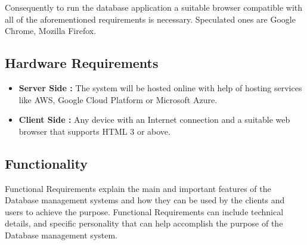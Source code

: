 \documentclass[12pt]{report}
\begin{document}
Consequently to run the database application a suitable browser compatible with all of the aforementioned requirements is necessary. Speculated ones are Google Chrome, Mozilla Firefox.




\subsection{Hardware Requirements}
\begin{itemize}
\item \textbf{Server Side :} The system will be hosted online with help of hosting services like AWS, Google Cloud Platform or Microsoft Azure. 

\item\textbf{Client Side :}   Any device with an Internet connection and a suitable web browser that supports HTML 3 or above. 
\end{itemize}



\subsection{Functionality}
Functional Requirements explain the main and important features of the Database management systems and how they can be used by the clients and users to achieve the purpose. Functional Requirements can include technical details, and specific personality that can help accomplish the purpose of the Database management system.
\end{document}
